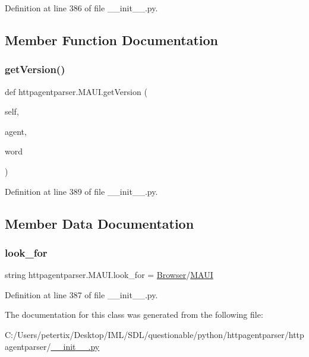 Definition at line 386 of file \+\_\+\+\_\+init\+\_\+\+\_\+.\+py.



\subsection{Member Function Documentation}
\hypertarget{classhttpagentparser_1_1_m_a_u_i_a1d3dc94b98aabc4a4f9f15c52e6f4404}{}\label{classhttpagentparser_1_1_m_a_u_i_a1d3dc94b98aabc4a4f9f15c52e6f4404} 
\subsubsection{\texorpdfstring{get\+Version()}{getVersion()}}
{\footnotesize\ttfamily def httpagentparser.\+M\+A\+U\+I.\+get\+Version (\begin{DoxyParamCaption}\item[{}]{self,  }\item[{}]{agent,  }\item[{}]{word }\end{DoxyParamCaption})}



Definition at line 389 of file \+\_\+\+\_\+init\+\_\+\+\_\+.\+py.



\subsection{Member Data Documentation}
\hypertarget{classhttpagentparser_1_1_m_a_u_i_afda465f6a86bd6de141bf079f36e662b}{}\label{classhttpagentparser_1_1_m_a_u_i_afda465f6a86bd6de141bf079f36e662b} 
\subsubsection{\texorpdfstring{look\+\_\+for}{look\_for}}
{\footnotesize\ttfamily string httpagentparser.\+M\+A\+U\+I.\+look\+\_\+for = \textquotesingle{}\hyperlink{classhttpagentparser_1_1_browser}{Browser}/\hyperlink{classhttpagentparser_1_1_m_a_u_i}{M\+A\+UI}\textquotesingle{}\hspace{0.3cm}{\ttfamily [static]}}



Definition at line 387 of file \+\_\+\+\_\+init\+\_\+\+\_\+.\+py.



The documentation for this class was generated from the following file\+:\begin{DoxyCompactItemize}
\item 
C\+:/\+Users/petertix/\+Desktop/\+I\+M\+L/\+S\+D\+L/questionable/python/httpagentparser/httpagentparser/\hyperlink{____init_____8py}{\+\_\+\+\_\+init\+\_\+\+\_\+.\+py}\end{DoxyCompactItemize}
